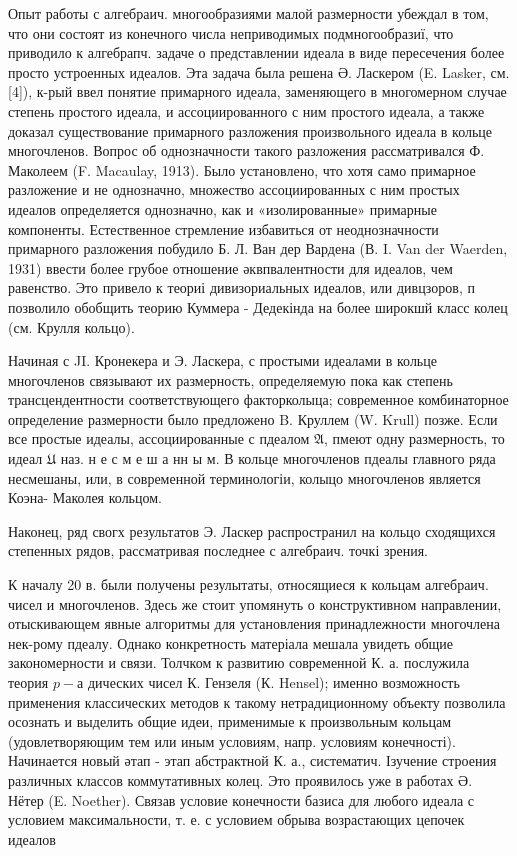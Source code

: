 \documentclass[10pt]{article}
\begin{document}
Опыт работы с алгебраич. многообразиями малой размерности убеждал в том, что они состоят из конечного числа неприводимых подмногообразиї, что приводило к алгебрапч. задаче о представлении идеала в виде пересечения более просто устроенных идеалов. Эта задача была решена Ә. Ласкером (E. Lasker, см. [4]), к-рый ввел понятие примарного идеала, заменяющего в многомерном случае степень простого идеала, и ассоциированного с ним простого идеала, а также доказал существование примарного разложения произвольного идеала в кольце многочленов. Вопрос об однозначности такого разложения рассматривался Ф. Маколеем (F. Macaulay, 1913). Было установлено, что хотя само примарное разложение и не однозначно, множество ассоциированных с ним простых идеалов определяется однозначно, как и «изолированные» примарные компоненты. Естественное стремление избавиться от неоднозначности примарного разложения побудило Б. Л. Ван дер Вардена (В. I. Van der Waerden, 1931) ввести более грубое отношение әквпвалентности для идеалов, чем равенство. Это привело к теориі дивизориальных идеалов, или дивцзоров, п позволило обобщить теорию Куммера - Дедекінда на более широкшй класс колец (см. Крулля кольцо).



Начиная с JI. Кронекера и Э. Ласкера, с простыми идеалами в кольце многочленов связывают их размерность, определяемую пока как степень трансцендентности соответствующего факторколыца; современное комбинаторное определение размерности было предложено B. Круллем (W. Krull) позже. Если все простые идеалы, ассоциированные с пдеалом $\mathfrak{A}$, пмеют одну размерность, то идеал $\mathfrak{U}$ наз. н е с м е ш а нн ы м. В кольце многочленов пдеалы главного ряда несмешаны, или, в современной терминологіи, колыцо многочленов является Коэна- Маколея кольцом.



Наконец, ряд свогх результатов Э. Ласкер распространил на кольцо сходящихся степенных рядов, рассматривая последнее с алгебраич. точкі зрения.



К началу 20 в. были получены резулытаты, относящиеся к кольцам алгебраич. чисел и многочленов. Здесь же стоит упомянуть о конструктивном направлении, отыскивающем явные алгоритмы для установления принадлежности многочлена нек-рому пдеалу. Однако конкретность матеріала мешала увидеть общие закономерности и связи. Толчком к развитию современной К. а. послужила теория $p-а$ дических чисел К. Гензеля (К. Hensel); именно возможность применения классических методов к такому нетрадиционному объекту позволила осознать и выделить общие идеи, применимые к произвольным кольцам (удовлетворяющим тем или иным условиям, напр. условиям конечності). Начинается новый әтап - этап абстрактной К. а., систематич. Ізучение строения различных классов коммутативных колец. Это проявилось уже в работах Ә. Нётер (E. Noether). Связав условие конечности базиса для любого идеала с условием максимальности, т. е. с условием обрыва возрастающих цепочек идеалов
\end{document}
